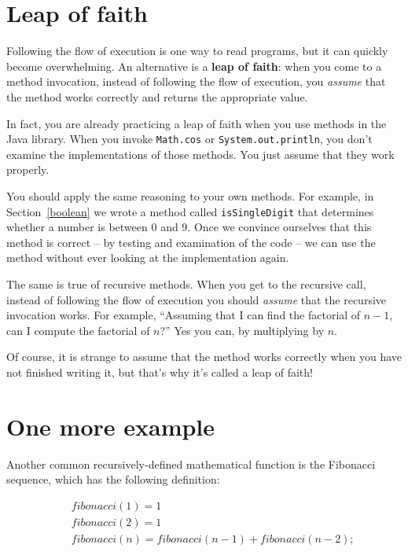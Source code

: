 \documentclass[12pt]{book}
\theoremstyle{exercise}
\newcommand{\java}[1]{\verb"#1"}
\begin{document}
\section{Leap of faith}
\label{leap of faith}


Following the flow of execution is one way to read programs, but it can quickly become overwhelming.
An alternative is a {\bf leap of faith}:
when you come to a method invocation, instead of following the flow of execution, you {\em assume} that the method works correctly and returns the appropriate value.

In fact, you are already practicing a leap of faith when you use methods in the Java library.
When you invoke \java{Math.cos} or \java{System.out.println}, you don't examine the implementations of those methods.
You just assume that they work properly.

You should apply the same reasoning to your own methods.
For example, in Section~\ref{boolean} we wrote a method called \java{isSingleDigit} that determines whether a number is between 0 and 9.
Once we convince ourselves that this method is correct -- by testing and examination of the code -- we can use the method without ever looking at the implementation again.

The same is true of recursive methods.
When you get to the recursive call, instead of following the flow of execution you should {\em assume} that the recursive invocation works.
For example, ``Assuming that I can find the factorial of $n-1$, can I compute the factorial of $n$?''
Yes you can, by multiplying by $n$.

Of course, it is strange to assume that the method works correctly when you have not finished writing it, but that's why it's called a leap of faith!


\section{One more example}
\label{fibonacci}


Another common recursively-defined mathematical function is the Fibonacci sequence, which has the following definition:

\vspace{-1ex}
\begin{eqnarray*}
&& fibonacci(1) = 1 \\
&& fibonacci(2) = 1 \\
&& fibonacci(n) = fibonacci(n-1) + fibonacci(n-2);
\end{eqnarray*}
\vspace{-1ex}
\end{document}

